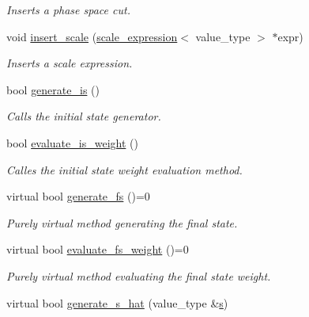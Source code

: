 \begin{DoxyCompactItemize}
\begin{DoxyCompactList}\small\item\em Inserts a phase space cut. \end{DoxyCompactList}\item 
\hypertarget{a00441_ad133fd61045d27c616d33b595833356d}{void \hyperlink{a00441_ad133fd61045d27c616d33b595833356d}{insert\-\_\-scale} (\hyperlink{a00489}{scale\-\_\-expression}$<$ value\-\_\-type $>$ $\ast$expr)}\label{a00441_ad133fd61045d27c616d33b595833356d}

\begin{DoxyCompactList}\small\item\em Inserts a scale expression. \end{DoxyCompactList}\item 
\hypertarget{a00441_a75a1a556e613a1f19bcc565ea8bfa0e2}{bool \hyperlink{a00441_a75a1a556e613a1f19bcc565ea8bfa0e2}{generate\-\_\-is} ()}\label{a00441_a75a1a556e613a1f19bcc565ea8bfa0e2}

\begin{DoxyCompactList}\small\item\em Calls the initial state generator. \end{DoxyCompactList}\item 
\hypertarget{a00441_aee7daadeecf22c2ba946b70a9609fef9}{bool \hyperlink{a00441_aee7daadeecf22c2ba946b70a9609fef9}{evaluate\-\_\-is\-\_\-weight} ()}\label{a00441_aee7daadeecf22c2ba946b70a9609fef9}

\begin{DoxyCompactList}\small\item\em Calles the initial state weight evaluation method. \end{DoxyCompactList}\item 
\hypertarget{a00441_acd32281788f0132a443757f84f937bf0}{virtual bool \hyperlink{a00441_acd32281788f0132a443757f84f937bf0}{generate\-\_\-fs} ()=0}\label{a00441_acd32281788f0132a443757f84f937bf0}

\begin{DoxyCompactList}\small\item\em Purely virtual method generating the final state. \end{DoxyCompactList}\item 
\hypertarget{a00441_aacf49e78f8847035a2d30683df19c73e}{virtual bool \hyperlink{a00441_aacf49e78f8847035a2d30683df19c73e}{evaluate\-\_\-fs\-\_\-weight} ()=0}\label{a00441_aacf49e78f8847035a2d30683df19c73e}

\begin{DoxyCompactList}\small\item\em Purely virtual method evaluating the final state weight. \end{DoxyCompactList}\item 
\hypertarget{a00441_a420fd6b3dfaed42cdf2424bb672fbfe5}{virtual bool \hyperlink{a00441_a420fd6b3dfaed42cdf2424bb672fbfe5}{generate\-\_\-s\-\_\-hat} (value\-\_\-type \&\hyperlink{a00442_a001116beb90eeda48f7cb668f67c8995}{s})}\label{a00441_a420fd6b3dfaed42cdf2424bb672fbfe5}


\end{DoxyCompactItemize}
